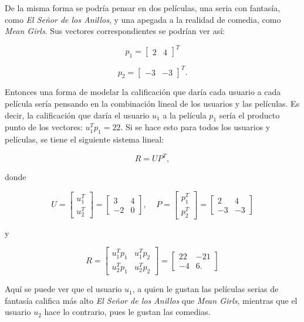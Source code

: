 De la misma forma se podría pensar en dos películas, una seria con fantasía, como \textit{El Señor de los Anillos}, y una apegada a la realidad de comedia, como \textit{Mean Girls}. Sus vectores correspondientes se podrían ver así:

\[
    p_1 = 
    \begin{bmatrix}
         2 & 4
    \end{bmatrix}^{T}
\]


\[
    p_2 = 
    \begin{bmatrix}
         -3 & -3
    \end{bmatrix}^{T}.
\]

Entonces una forma de modelar la calificación que daría cada usuario a cada película sería pensando en la combinación lineal de los usuarios y las películas. Es decir, la calificación que daría el usuario $u_1$ a la película $p_1$ sería el producto punto de los vectores: $u_1^T p_1 = 22$. Si se hace esto para todos los usuarios y películas, se tiene el siguiente sistema lineal:

\[
    R = UP^T,
\]


donde

\[
    U = 
    \begin{bmatrix}
         u_1^T \\ 
         u_2^T
    \end{bmatrix} =
    \begin{bmatrix}
         3 & 4 \\ 
         -2 & 0
    \end{bmatrix},\;\;\;\;
    P = 
    \begin{bmatrix}
         p_1^T \\ 
         p_2^T
    \end{bmatrix} =
    \begin{bmatrix}
         2 & 4 \\ 
         -3 & -3
    \end{bmatrix}
\]

y

\[
    R = 
    \begin{bmatrix}
         u_1 ^T p_1 & u_1 ^T p_2 \\ 
         u_2 ^T p_1 & u_2 ^T p_2
    \end{bmatrix}
    =
    \begin{bmatrix}
        22 & -21 \\
        -4 & 6.
    \end{bmatrix}
\]

Aquí se puede ver que el usuario $u_1$, a quien le gustan las películas serias de fantasía califica más alto \textit{El Señor de los Anillos} que \textit{Mean Girls}, mientras que el usuario $u_2$ hace lo contrario, pues le gustan las comedias.

